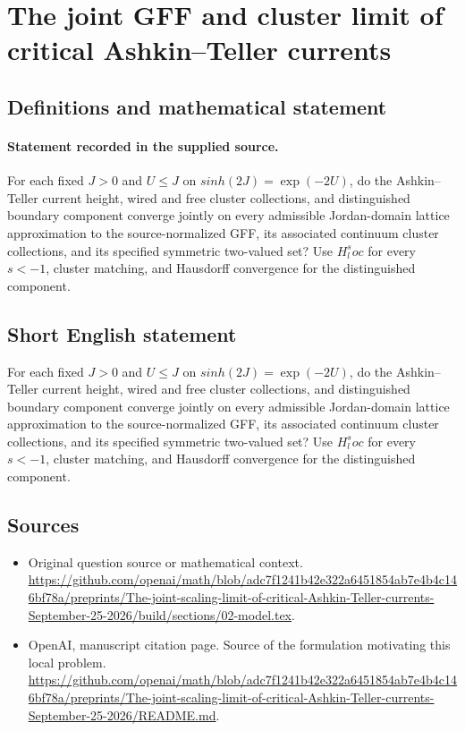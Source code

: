 \documentclass[11pt]{article}
\begin{document}
\section*{The joint GFF and cluster limit of critical Ashkin–Teller currents}\label{30007344}
\subsection{Definitions and mathematical statement}
\paragraph{Statement recorded in the supplied source.}
For each fixed $J>0$ and $U\leq J$ on $sinh(2J)=\exp (-2U)$, do the Ashkin–Teller current height, wired and free cluster collections, and distinguished boundary component converge jointly on every admissible Jordan-domain lattice approximation to the source-normalized GFF, its associated continuum cluster collections, and its specified symmetric two-valued set? Use $H^s_loc$ for every $s<-1$, cluster matching, and Hausdorff convergence for the distinguished component.
\subsection{Short English statement}
For each fixed $J>0$ and $U\leq J$ on $sinh(2J)=\exp (-2U)$, do the Ashkin–Teller current height, wired and free cluster collections, and distinguished boundary component converge jointly on every admissible Jordan-domain lattice approximation to the source-normalized GFF, its associated continuum cluster collections, and its specified symmetric two-valued set? Use $H^s_loc$ for every $s<-1$, cluster matching, and Hausdorff convergence for the distinguished component.
\subsection{Sources}
\begin{itemize}
\item[S1] Original question source or mathematical context.
\url{https://github.com/openai/math/blob/adc7f1241b42e322a6451854ab7e4b4c146bf78a/preprints/The-joint-scaling-limit-of-critical-Ashkin-Teller-currents-September-25-2026/build/sections/02-model.tex}.
\item[S2] OpenAI, manuscript citation page. Source of the formulation motivating this local problem.
\url{https://github.com/openai/math/blob/adc7f1241b42e322a6451854ab7e4b4c146bf78a/preprints/The-joint-scaling-limit-of-critical-Ashkin-Teller-currents-September-25-2026/README.md}.
\end{itemize}
\end{document}
